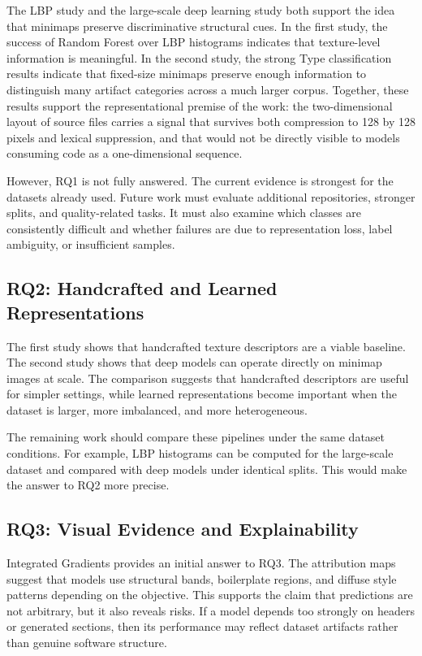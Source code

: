 The LBP study and the large-scale deep learning study both support the idea that
minimaps preserve discriminative structural cues. In the first study, the
success of Random Forest over LBP histograms indicates that texture-level
information is meaningful. In the second study, the strong Type classification
results indicate that fixed-size minimaps preserve enough information to
distinguish many artifact categories across a much larger corpus. Together,
these results support the representational premise of the work: the
two-dimensional layout of source files carries a signal that survives both
compression to 128 by 128 pixels and lexical suppression, and that would not be
directly visible to models consuming code as a one-dimensional sequence.

However, RQ1 is not fully answered. The current evidence is strongest for the
datasets already used. Future work must evaluate additional repositories,
stronger splits, and quality-related tasks. It must also examine which classes
are consistently difficult and whether failures are due to representation loss,
label ambiguity, or insufficient samples.

\subsection{RQ2: Handcrafted and Learned Representations}

The first study shows that handcrafted texture descriptors are a viable
baseline. The second study shows that deep models can operate directly on
minimap images at scale. The comparison suggests that handcrafted descriptors
are useful for simpler settings, while learned representations become important
when the dataset is larger, more imbalanced, and more heterogeneous.

The remaining work should compare these pipelines under the same dataset
conditions. For example, LBP histograms can be computed for the large-scale
dataset and compared with deep models under identical splits. This would make
the answer to RQ2 more precise.

\subsection{RQ3: Visual Evidence and Explainability}

Integrated Gradients provides an initial answer to RQ3. The attribution maps
suggest that models use structural bands, boilerplate regions, and diffuse style
patterns depending on the objective. This supports the claim that predictions
are not arbitrary, but it also reveals risks. If a model depends too strongly on
headers or generated sections, then its performance may reflect dataset
artifacts rather than genuine software structure.

